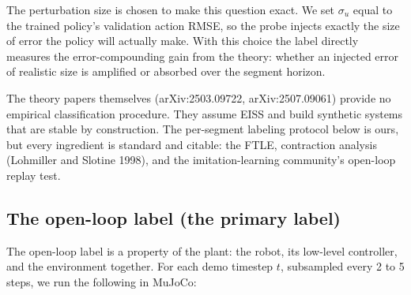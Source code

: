 \documentclass[11pt]{article}
\begin{document}
The perturbation size is chosen to make this question exact. We set $\sigma_u$ equal to
the trained policy's validation action RMSE, so the probe injects exactly the size of
error the policy will actually make. With this choice the label directly measures the
error-compounding gain from the theory: whether an injected error of realistic size is
amplified or absorbed over the segment horizon.

The theory papers themselves (arXiv:2503.09722, arXiv:2507.09061) provide no empirical
classification procedure. They assume EISS and build synthetic systems that are stable
by construction. The per-segment labeling protocol below is ours, but every ingredient
is standard and citable: the FTLE, contraction analysis (Lohmiller and Slotine 1998),
and the imitation-learning community's open-loop replay test.

\subsection{The open-loop label (the primary label)}

The open-loop label is a property of the plant: the robot, its low-level controller, and
the environment together. For each demo timestep $t$, subsampled every 2 to 5 steps, we
run the following in MuJoCo:
\end{document}
